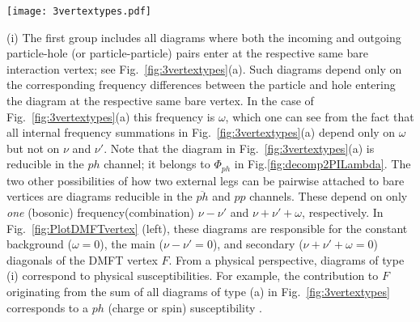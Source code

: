 \documentclass[rmp,aps,reprint,amsmath,amssymb,superscriptaddress,showpacs,nofootinbib]{revtex4-1}
\begin{document}
\begin{figure*}[t!]
  \centering
  \texttt{[image: 3vertextypes.pdf]}
    \caption{(Color online) Categorization of diagrams according to their frequency dependence. (a) Diagram where the left and right pairs of external lines are attached to the same two bare interaction vertices, (b) diagram where only the left external lines are connected to the same bare vertex, and (c) diagram where all external lines enter at different bare vertices. The external frequencies, on which the diagram depends explicitly, are marked in red (gray).}
  \label{fig:3vertextypes}
\end{figure*}

(i) The first group includes all diagrams where both the incoming and outgoing particle-hole (or particle-particle) pairs enter at the respective same bare interaction vertex; see Fig.~\ref{fig:3vertextypes}(a). Such diagrams depend only on the corresponding frequency differences between the particle and hole entering the diagram at the respective same bare vertex. In the case of  Fig.~\ref{fig:3vertextypes}(a) this frequency is $\omega$, which one can see from the fact that all internal frequency summations in Fig.~\ref{fig:3vertextypes}(a) depend only on $\omega$ but not on $\nu$ and $\nu'$.  Note that the diagram in Fig.~\ref{fig:3vertextypes}(a) is reducible in the $ph$ channel; it belongs to $\Phi_{ph}$ in  Fig.\ref{fig:decomp2PILambda}. The two other  possibilities of how two external legs can be pairwise attached to bare vertices are diagrams reducible in the $\overline{ph}$ and $pp$ channels. These depend on only {\sl one} (bosonic) frequency(combination) $\nu-\nu'$ and $\nu+\nu'+\omega$, respectively. In Fig.~\ref{fig:PlotDMFTvertex} (left), these diagrams are responsible for the constant background ($\omega=0$), the main ($\nu-\nu'=0$), and secondary ($\nu+\nu'+\omega=0$) diagonals of the DMFT vertex $F$. From a physical perspective, diagrams of type (i) correspond to physical susceptibilities. For example, the contribution to $F$ originating from the sum of all diagrams of type (a) in  Fig.~\ref{fig:3vertextypes} corresponds to a $ph$ (charge or spin) susceptibility \cite{Rohringer2012,Rohringer2013,Wentzell2016}.
\end{document}
